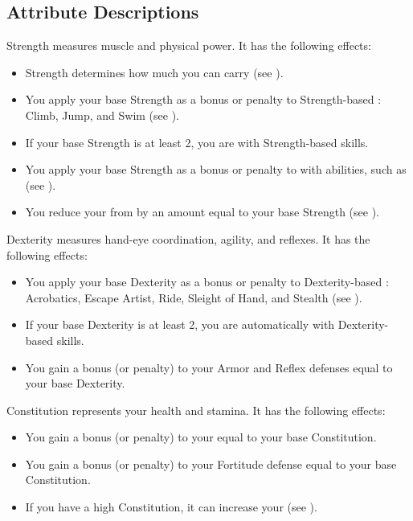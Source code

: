    \subsection{Attribute Descriptions}

        \label{Strength}
        {
            Strength measures muscle and physical power.
            It has the following effects:
            \begin{itemize}
                \item Strength determines how much you can carry (see ).
                \item You apply your base Strength as a bonus or penalty to Strength-based : Climb, Jump, and Swim (see ).
                \item If your base Strength is at least 2, you are  with Strength-based skills.
                \item You apply your base Strength as a bonus or penalty to  with  abilities, such as  (see ).
                \item You reduce your  from  by an amount equal to your base Strength (see ).
            \end{itemize}
        }

        \label{Dexterity}
        {
            Dexterity measures hand-eye coordination, agility, and reflexes.
            It has the following effects:
            \begin{itemize}
                \item You apply your base Dexterity as a bonus or penalty to Dexterity-based : Acrobatics, Escape Artist, Ride, Sleight of Hand, and Stealth (see ).
                \item If your base Dexterity is at least 2, you are automatically  with Dexterity-based skills.
                \item You gain a bonus (or penalty) to your Armor and Reflex defenses equal to your base Dexterity.
            \end{itemize}
        }

        \label{Constitution}
        {
            Constitution represents your health and stamina.
            It has the following effects:
            \begin{itemize}
                \item You gain a bonus (or penalty) to your  equal to your base Constitution.
                \item You gain a bonus (or penalty) to your Fortitude defense equal to your base Constitution.
                \item If you have a high Constitution, it can increase your  (see ).
            \end{itemize}
        }

